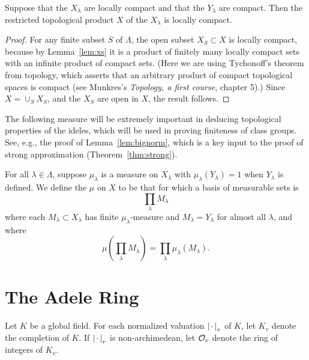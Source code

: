 \begin{lemma}\label{lem:res_compact}
  Suppose that the $X_\lambda$ are locally compact and that the
  $Y_\lambda$ are compact.  Then the restricted topological
product $X$ of the $X_\lambda$ is locally compact.
\end{lemma}
\begin{proof}
  For any finite subset $S$ of $\Lambda$, the open subset $X_S\subset
  X$ is locally compact, because by Lemma~\ref{lem:xs} it is a product
  of finitely many locally compact sets with an infinite product of
  compact sets.  (Here we are using Tychonoff's theorem from topology,
  which asserts that an arbitrary product of compact topological
  spaces is compact (see Munkres's {\em Topology, a first course},
  chapter 5).) Since $X=\cup_{S} X_S$, and the $X_S$ are open in $X$,
  the result follows.
\end{proof}

The following measure will be extremely important in deducing
topological properties of the ideles, which will be used in
proving finiteness of class groups.  See, e.g., the
proof of Lemma~\ref{lem:bignorm}, which is a key input
to the proof of strong approximation (Theorem~\ref{thm:strong}).
\begin{definition}\label{defn:prodmeasure}
  For all $\lambda\in\Lambda$, suppose $\mu_\lambda$ is a measure on
  $X_\lambda$ with $\mu_\lambda(Y_\lambda) = 1$ when $Y_\lambda$ is
  defined.  We define the  $\mu$ on $X$ to be
  that for which a basis of measurable sets is $$\prod_\lambda
  M_\lambda$$
  where each $M_\lambda\subset X_\lambda$ has finite
  $\mu_\lambda$-measure and
  $M_\lambda=Y_\lambda$ for almost all $\lambda$, and where
  $$
  \mu\left(\prod_\lambda M_\lambda\right) = \prod_\lambda
  \mu_\lambda(M_\lambda).
  $$
\end{definition}

\section{The Adele Ring}
Let $K$ be a global field.  For each normalized valuation $\left|\,\cdot\,\right|_v$ of $K$,
let $K_v$ denote the completion of $K$.  If $\left|\,\cdot\,\right|_v$ is
non-archimedean, let $\mathcal{O}_v$ denote the ring of integers of $K_v$.
\renewcommand{\AA}{\mathbb{A}}

